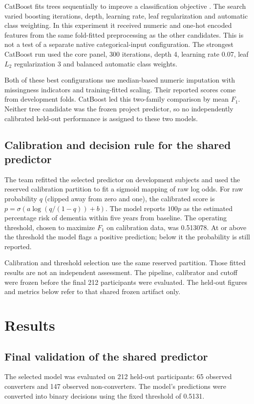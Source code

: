 \documentclass[11pt,a4paper]{article}
\begin{document}
CatBoost fits trees sequentially to improve a classification objective \cite{cat}. The search varied boosting iterations, depth, learning rate, leaf regularization and automatic class weighting. In this experiment it received numeric and one-hot encoded features from the same fold-fitted preprocessing as the other candidates. This is not a test of a separate native categorical-input configuration. The strongest CatBoost run used the core panel, 300 iterations, depth 4, learning rate 0.07, leaf $L_2$ regularization 3 and balanced automatic class weights.

Both of these best configurations use median-based numeric imputation with missingness indicators and training-fitted scaling. Their reported scores come from development folds. CatBoost led this two-family comparison by mean $F_1$. Neither tree candidate was the frozen project predictor, so no independently calibrated held-out performance is assigned to these two models.
\clearpage
\subsection{Calibration and decision rule for the shared predictor}
The team refitted the selected predictor on development subjects and used the reserved calibration partition to fit a sigmoid mapping of raw log odds. For raw probability $q$ (clipped away from zero and one), the calibrated score is $p=\sigma(a\log(q/(1-q))+b)$. The model reports $100p$ as the estimated percentage risk of dementia within five years from baseline. The operating threshold, chosen to maximize $F_1$ on calibration data, was 0.513078. At or above the threshold the model flags a positive prediction; below it the probability is still reported.

Calibration and threshold selection use the same reserved partition. Those fitted results are not an independent assessment. The pipeline, calibrator and cutoff were frozen before the final 212 participants were evaluated. The held-out figures and metrics below refer to that shared frozen artifact only.

\clearpage
\section{Results}
\subsection{Final validation of the shared predictor}
The selected model was evaluated on 212 held-out participants: 65 observed converters and 147 observed non-converters. The model's predictions were converted into binary decisions using the fixed threshold of 0.5131.
\end{document}
